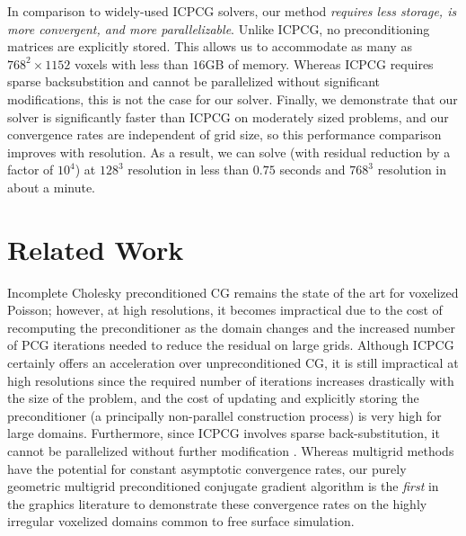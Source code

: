 In comparison to widely-used ICPCG solvers, our method \emph{requires less storage, is more convergent, and more parallelizable}.  Unlike ICPCG, no preconditioning matrices are explicitly stored.  This allows us to accommodate as many as $768^2\!\times\!1152$ voxels with less than $16$GB of memory. Whereas ICPCG requires sparse backsubstition and cannot be parallelized without significant modifications, this is not the case for our solver.  Finally, we demonstrate that our solver is significantly faster than ICPCG on moderately sized problems, and our convergence rates are independent of grid size, so this performance comparison improves with resolution.  As a result, we can solve (with residual reduction by a factor of $10^4$) at $128^3$ resolution in less than $0.75$ seconds and $768^3$ resolution in about a minute.

\section{Related Work}

Incomplete Cholesky preconditioned CG remains the state of the art for voxelized Poisson; however, at high resolutions, it becomes impractical due to the cost of recomputing the preconditioner as the domain changes and the increased number of PCG iterations needed to reduce the residual on large grids.  
Although ICPCG certainly offers an acceleration over unpreconditioned CG, it is still impractical at high resolutions since the required number of iterations increases drastically with the size of the problem, and the cost of updating and explicitly storing the preconditioner (a principally non-parallel construction process) 
is very high for large domains.  Furthermore, since ICPCG involves sparse back-substitution, it cannot be parallelized without further modification \cite{Hughes:2007:physicalsimulation}.
Whereas multigrid methods have the potential for constant asymptotic convergence rates, our purely geometric multigrid preconditioned conjugate gradient algorithm is the \emph{first} in the graphics literature to demonstrate these convergence rates on the highly irregular voxelized domains common to free surface simulation.

